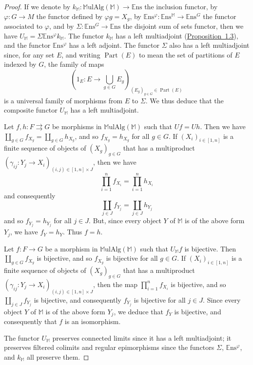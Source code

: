 \documentclass{article}
\newcommand{\bb}[1]{{\mathbb{#1}}}
\newcommand{\Set}{\mathbb{E}\mathrm{ns}}
\newcommand{\MulAlg}{\mathbb{M}\mathrm{ulAlg}}
\DeclareMathOperator{\Part}{Part}
\newcommand{\oldpage}[1]{\marginpar{\footnotesize$\Big\vert$ \textit{p.~#1}}}
\begin{document}
\begin{proof}
  If we denote by $k_\bb{M}\colon\MulAlg(\bb{M})\to\Set$ the inclusion functor, by $\varphi\colon G\to M$ the functor defined by $\varphi g=X_g$, by $\Set^\varphi\colon\Set^\bb{M}\to\Set^G$ the functor associated to $\varphi$, and by $\Sigma\colon\Set^G\to\Set$ the disjoint sum of sets functor, then we have $U_\bb{M}=\Sigma\Set^\varphi k_\bb{M}$.
  The functor $k_\bb{M}$ has a left multiadjoint (\hyperref[1.3]{Proposition~1.3}), and the functor $\Set^\varphi$ has a left adjoint.
  The functor $\Sigma$ also has a left multiadjoint since, for any set $E$, and writing $\Part(E)$ to mean the set of partitions of $E$ indexed by $G$, the family of maps
  \[
    \left(1_E\colon E\to\bigcup_{g\in G}E_g\right)_{(E_g)_{g\in G}\in\Part(E)}
  \]
  is a universal family of morphisms from $E$ to $\Sigma$.
  We thus deduce that the composite functor $U_\bb{M}$ has a left multiadjoint.

  Let $f,h\colon F\rightrightarrows G$ be morphisms in $\MulAlg(\bb{M})$ such that $Uf=Uh$.
  Then we have $\coprod_{g\in G}f_{X_g}=\coprod_{g\in G}h_{X_g}$, and so $f_{X_g}=h_{X_g}$ for all $g\in G$.
  If $(X_i)_{i\in[1,n]}$ is a finite sequence of objects of $(X_g)_{g\in G}$ that has a multiproduct $(\gamma_{ij}\colon Y_j\to X_i)_{(i,j)\in[1,n]\times J}$, then we have
  \[
    \prod_{i=1}^n f_{X_i} = \prod_{i=1}^n h_{X_i}
  \]
  and consequently
  \[
    \coprod_{j\in J} f_{Y_j} = \coprod_{j\in J} h_{Y_j}
  \]
  and so $f_{Y_j}=h_{Y_j}$ for all $j\in J$.
  But, since every object $Y$ of $\bb{M}$ is of the above form $Y_j$, we have $f_Y=h_Y$.
  Thus $f=h$.

\oldpage{200}
  Let $f\colon F\to G$ be a morphism in $\MulAlg(\bb{M})$ such that $U_\bb{M}f$ is bijective.
  Then $\coprod_{g\in G}f_{X_g}$ is bijective, and so $f_{X_g}$ is bijective for all $g\in G$.
  If $(X_i)_{i\in[1,n]}$ is a finite sequence of objects of $(X_g)_{g\in G}$ that has a multiproduct $(\gamma_{ij}\colon Y_j\to X_i)_{(i,j)\in[1,n]\times J}$, then the map $\prod_{i=1}^nf_{X_i}$ is bijective, and so $\coprod_{j\in J}f_{Y_j}$ is bijective, and consequently $f_{Y_j}$ is bijective for all $j\in J$.
  Since every object $Y$ of $\bb{M}$ is of the above form $Y_j$, we deduce that $f_Y$ is bijective, and consequently that $f$ is an isomorphism.

  The functor $U_\bb{M}$ preserves connected limits since it has a left multiadjoint; it preserves filtered colimits and regular epimorphisms since the functors $\Sigma$, $\Set^\varphi$, and $k_\bb{M}$ all preserve them.
\end{proof}
\end{document}
